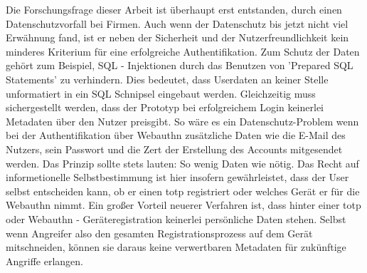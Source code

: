 \begin{itemize}
Die Forschungsfrage dieser Arbeit ist überhaupt erst entstanden, durch einen Datenschutzvorfall bei Firmen. Auch wenn der Datenschutz bis jetzt nicht viel Erwähnung fand, ist er neben der Sicherheit und der Nutzerfreundlichkeit kein minderes Kriterium für eine erfolgreiche Authentifikation. Zum Schutz der Daten gehört zum Beispiel, SQL - Injektionen durch das Benutzen von 'Prepared SQL Statements' zu verhindern. Dies bedeutet, dass Userdaten an keiner Stelle unformatiert in ein SQL Schnipsel eingebaut werden. Gleichzeitig muss sichergestellt werden, dass der Prototyp bei erfolgreichem Login keinerlei Metadaten über den Nutzer preisgibt. So wäre es ein Datenschutz-Problem wenn bei der Authentifikation über Webauthn zusätzliche Daten wie die E-Mail des Nutzers, sein Passwort und die Zert der Erstellung des Accounts mitgesendet werden. Das Prinzip sollte stets lauten: So wenig Daten wie nötig. Das Recht auf informetionelle Selbstbestimmung ist hier insofern gewährleistet, dass der User selbst entscheiden kann, ob er einen \ac{totp} registriert oder welches Gerät er für die Webauthn nimmt. Ein großer Vorteil neuerer Verfahren ist, dass hinter einer \ac{totp} oder Webauthn - Geräteregistration keinerlei persönliche Daten stehen. Selbst wenn Angreifer also den gesamten Registrationsprozess auf dem Gerät mitschneiden, können sie daraus keine verwertbaren Metadaten für zukünftige Angriffe erlangen.
\end{itemize}
